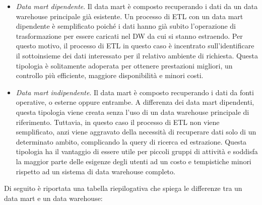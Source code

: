 \begin{itemize}
    \item \textit{Data mart dipendente}. Il data mart è composto recuperando i dati da un data warehouse principale già esistente. Un processo di ETL con un data mart dipendente è semplificato poiché i dati hanno già subito l'operazione di trasformazione per essere caricati nel DW da cui si stanno estraendo. Per questo motivo, il processo di ETL in questo caso è incentrato sull'identificare il sottoinsieme dei dati interessato per il relativo ambiente di richiesta. Questa tipologia è solitamente adoperata per ottenere prestazioni migliori, un controllo più efficiente, maggiore disponibilità e minori costi.
    \item \textit{Data mart indipendente}. Il data mart è composto recuperando i dati da fonti operative, o esterne oppure entrambe. A differenza dei data mart dipendenti, questa tipologia viene creata senza l'uso di un data warehouse principale di riferimento. Tuttavia, in questo caso il processo di ETL non viene semplificato, anzi viene aggravato della necessità di recuperare dati solo di un determinato ambito, complicando la query di ricerca ed estrazione. Questa tipologia ha il vantaggio di essere utile per piccoli gruppi di attività e soddisfa la maggior parte delle esigenze degli utenti ad un costo e tempistiche minori rispetto ad un sistema di data warehouse completo.
\end{itemize}

Di seguito è riportata una tabella riepilogativa che spiega le differenze tra un data mart e un data warehouse:\cite{streamsets_data_mart_vs_data_warehouse}

